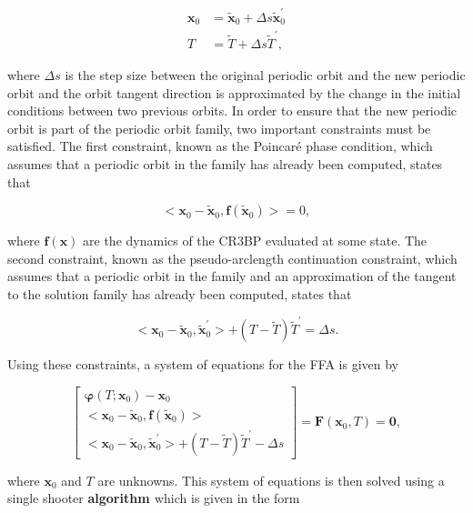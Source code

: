 \documentclass[11pt]{article} %
\begin{document}
\begin{align}
	\bm{x}_0 &= \tilde{\bm{x}}_0 + \Delta s\tilde{\bm{x}}_0^{\prime} \\
	T &= \tilde{T} + \Delta s\tilde{T}^{\prime},
\end{align}

\noindent
where $\Delta s$ is the step size between the original periodic orbit and the new periodic orbit and the orbit tangent direction is approximated by the change in the initial conditions between two previous orbits. In order to ensure that the new periodic orbit is part of the periodic orbit family, two important constraints must be satisfied. The first constraint, known as the Poincar\'{e} phase condition, which assumes that a periodic orbit in the family has already been computed, states that 

\begin{equation}
	<\bm{x}_0 - \tilde{\bm{x}}_0, \bm{f}\left(\tilde{\bm{x}}_0\right)> = 0,
\end{equation}

\noindent
where $\bm{f}\left(\bm{x}\right)$ are the dynamics of the CR3BP evaluated at some state. The second constraint, known as the pseudo-arclength continuation constraint, which assumes that a periodic orbit in the family and an approximation of the tangent to the solution family has already been computed, states that

\begin{equation}
<\bm{x}_0 - \tilde{\bm{x}}_0, \tilde{\bm{x}}_0^{\prime}> + \left(T-\tilde{T}\right)\tilde{T}^{\prime} = \Delta s.
\end{equation}

\noindent
Using these constraints, a system of equations for the FFA is given by

\doublespace
\begin{equation}
	\label{e:ffa_constraints}
	\begin{bmatrix}
	\bm{\varphi}\left(T;\bm{x}_0\right) - \bm{x}_0 \\
	<\bm{x}_0 - \tilde{\bm{x}}_0, \bm{f}\left(\tilde{\bm{x}}_0\right)> \\
	<\bm{x}_0 - \tilde{\bm{x}}_0, \tilde{\bm{x}}_0^{\prime}> + \left(T-\tilde{T}\right)\tilde{T}^{\prime} - \Delta s
	\end{bmatrix} = \bm{F}\left(\bm{x}_0, T\right) = \bm{0},
\end{equation}
\singlespace

\noindent
where $\bm{x}_0$ and $T$ are unknowns. This system of equations is then solved using a single shooter \textbf{algorithm \cite{SingleShooter}} which is given in the form
\end{document}
